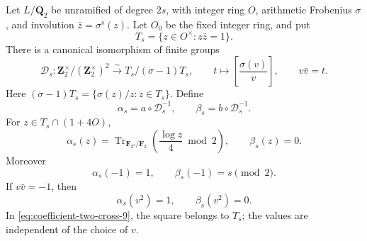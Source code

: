\begin{lemma}\label{lem:two-norm-one-coinvariants}
Let \(L/\mathbf Q_2\) be unramified of degree \(2s\),
with integer ring \(O\), arithmetic Frobenius \(\sigma\),
and involution \(\bar z=\sigma^s(z)\). Let \(O_0\)
be the fixed integer ring, and put
\[
             T_s=\{z\in O^\times:z\bar z=1\}.
\]
There is a canonical isomorphism of finite groups
\begin{equation}
 \mathcal D_s:
 \mathbf Z_2^\times/(\mathbf Z_2^\times)^2
       \xrightarrow{\ \sim\ } T_s/(\sigma-1)T_s,
 \qquad
 t\longmapsto\left[\frac{\sigma(v)}v\right],
 \qquad v\bar v=t.
                                                        \label{eq:coefficient-two-cross-6}
\end{equation}
Here \((\sigma-1)T_s=\{\sigma(z)/z:z\in T_s\}\).
Define
\[
        \alpha_s=a\circ\mathcal D_s^{-1},\qquad
        \beta_s=b\circ\mathcal D_s^{-1}.
\]
For \(z\in T_s\cap(1+4O)\),
\begin{equation}
 \alpha_s(z)=
 \operatorname{Tr}_{\mathbf F_{2^s}/\mathbf F_2}
       \left(\frac{\log z}{4}\bmod2\right),
 \qquad \beta_s(z)=0.                                   \label{eq:coefficient-two-cross-7}
\end{equation}
Moreover
\begin{equation}
                  \alpha_s(-1)=1,
       \qquad \beta_s(-1)=s\pmod2.                       \label{eq:coefficient-two-cross-8}
\end{equation}
If \(v\bar v=-1\), then
\begin{equation}
                   \alpha_s(v^2)=1,
              \qquad \beta_s(v^2)=0.                    \label{eq:coefficient-two-cross-9}
\end{equation}
In \eqref{eq:coefficient-two-cross-9}, the square belongs to \(T_s\); the values are
independent of the choice of \(v\).
\end{lemma}


